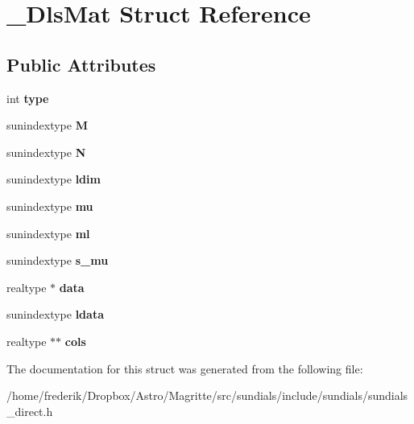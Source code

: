 \hypertarget{struct__DlsMat}{}\section{\+\_\+\+Dls\+Mat Struct Reference}
\label{struct__DlsMat}
\subsection*{Public Attributes}
\begin{DoxyCompactItemize}
\item 
\mbox{\label{struct__DlsMat_a9b6ae7fe59e68232b7e39d809c3c9348}} 
int {\bfseries type}
\item 
\mbox{\label{struct__DlsMat_afe31b7f94a2616fa3f447ad9a75b346f}} 
sunindextype {\bfseries M}
\item 
\mbox{\label{struct__DlsMat_a3c607308a16b3be86dbe897a1150ea09}} 
sunindextype {\bfseries N}
\item 
\mbox{\label{struct__DlsMat_a21cc074b7d7b2f1bebcd18bc0408115f}} 
sunindextype {\bfseries ldim}
\item 
\mbox{\label{struct__DlsMat_ac72b0303082225dbf9b51419cb46a38a}} 
sunindextype {\bfseries mu}
\item 
\mbox{\label{struct__DlsMat_a38f694226e3cd3f4a7afe236499f544e}} 
sunindextype {\bfseries ml}
\item 
\mbox{\label{struct__DlsMat_a257b8a7c9ae5d9f882f03f0387186f9c}} 
sunindextype {\bfseries s\+\_\+mu}
\item 
\mbox{\label{struct__DlsMat_acb3737b000b7924312cf10f45ab48cb2}} 
realtype $\ast$ {\bfseries data}
\item 
\mbox{\label{struct__DlsMat_a9346f971c82da7d436909f9b479d46ba}} 
sunindextype {\bfseries ldata}
\item 
\mbox{\label{struct__DlsMat_a571bbb3e7830af7848a5037852d88e43}} 
realtype $\ast$$\ast$ {\bfseries cols}
\end{DoxyCompactItemize}


The documentation for this struct was generated from the following file\+:\begin{DoxyCompactItemize}
\item 
/home/frederik/\+Dropbox/\+Astro/\+Magritte/src/sundials/include/sundials/sundials\+\_\+direct.\+h\end{DoxyCompactItemize}
